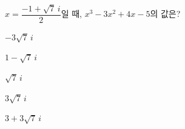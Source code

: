 $x=\dfrac{-1+\sqrt{7}\,i}{2}$일 때, $x^3-3x^2+4x-5$의 값은?
\begin{choices32}{\rule[-3ex]{0pt}{8ex}$-3\sqrt{7}\,i$}{\rule[-3ex]{0pt}{8ex}$1-\sqrt{7}\,i$}{\rule[-3ex]{0pt}{8ex}$\sqrt{7}\,i$}{\rule[-3ex]{0pt}{8ex}$3\sqrt{7}\,i$}{\rule[-3ex]{0pt}{8ex}$3+3\sqrt{7}\,i$}\end{choices32}
